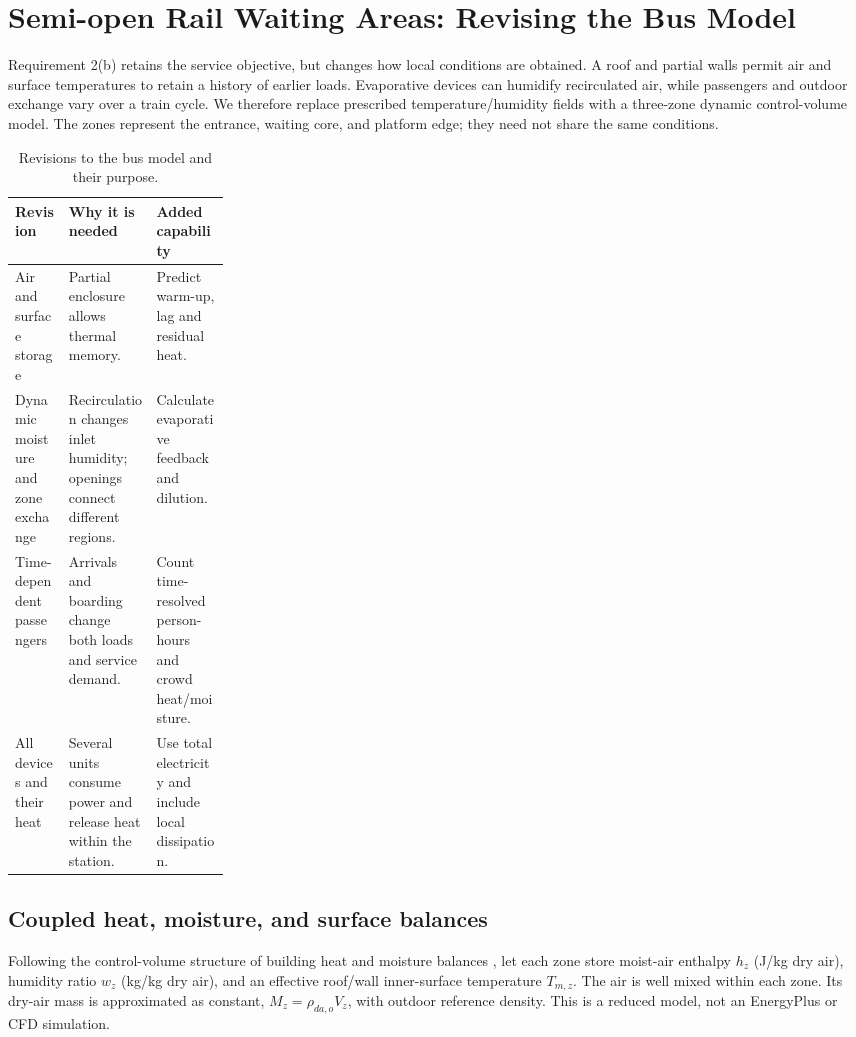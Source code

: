 \section{Semi-open Rail Waiting Areas: Revising the Bus Model}
\label{sec:rail}

Requirement 2(b) retains the service objective, but changes how local conditions are obtained. A roof and partial walls permit air and surface temperatures to retain a history of earlier loads. Evaporative devices can humidify recirculated air, while passengers and outdoor exchange vary over a train cycle. We therefore replace prescribed temperature/humidity fields with a three-zone dynamic control-volume model. The zones represent the entrance, waiting core, and platform edge; they need not share the same conditions.

\begin{table}[!ht]
\centering\small
\caption{Revisions to the bus model and their purpose.}
\label{tab:rail-changes}
\begin{tabularx}{\linewidth}{@{}>{\raggedright\arraybackslash}p{0.25\linewidth}>{\raggedright\arraybackslash}X>{\raggedright\arraybackslash}X@{}}
\toprule
Revision & Why it is needed & Added capability\\
\midrule
Air and surface storage & Partial enclosure allows thermal memory. & Predict warm-up, lag and residual heat.\\
Dynamic moisture and zone exchange & Recirculation changes inlet humidity; openings connect different regions. & Calculate evaporative feedback and dilution.\\
Time-dependent passengers & Arrivals and boarding change both loads and service demand. & Count time-resolved person-hours and crowd heat/moisture.\\
All devices and their heat & Several units consume power and release heat within the station. & Use total electricity and include local dissipation.\\
\bottomrule
\end{tabularx}
\end{table}

\subsection{Coupled heat, moisture, and surface balances}

Following the control-volume structure of building heat and moisture balances \cite{epzone}, let each zone store moist-air enthalpy $h_z$ (J/kg dry air), humidity ratio $w_z$ (kg/kg dry air), and an effective roof/wall inner-surface temperature $T_{m,z}$. The air is well mixed within each zone. Its dry-air mass is approximated as constant, $M_z=\rho_{da,o}V_z$, with outdoor reference density. This is a reduced model, not an EnergyPlus or CFD simulation.

